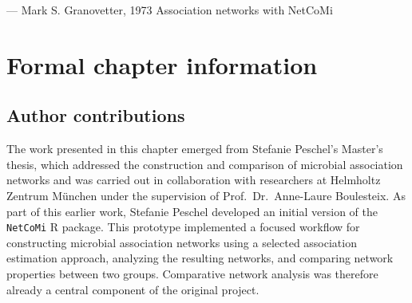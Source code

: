 
  {--- Mark S. Granovetter, 1973}
  {Association networks with NetCoMi}
\nocite{granovetter1973strength}
\chaptercontents

\section*{Formal chapter information}

\subsection*{Author contributions}

The work presented in this chapter emerged from Stefanie Peschel's Master's thesis, which addressed the construction and comparison of microbial association networks and was carried out in collaboration with researchers at Helmholtz Zentrum München under the supervision of Prof.\ Dr.\ Anne-Laure Boulesteix. As part of this earlier work, Stefanie Peschel developed an initial version of the \texttt{NetCoMi} R package. This prototype implemented a focused workflow for constructing microbial association networks using a selected association estimation approach, analyzing the resulting networks, and comparing network properties between two groups. Comparative network analysis was therefore already a central component of the original project.

